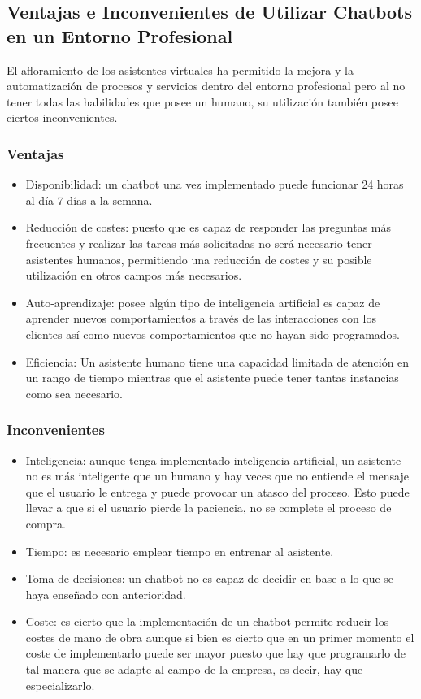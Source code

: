\subsection{Ventajas e Inconvenientes de Utilizar Chatbots en un Entorno Profesional}
El afloramiento de los asistentes virtuales ha permitido la mejora y la automatización de procesos y servicios dentro del entorno profesional pero al no tener todas las habilidades que posee un humano, su utilización también posee ciertos inconvenientes.

\subsubsection{Ventajas}

\begin{itemize}
    \item Disponibilidad: un chatbot una vez implementado puede funcionar 24 horas al día 7 días a la semana.
    \item Reducción de costes: puesto que es capaz de responder las preguntas más frecuentes y realizar las tareas más solicitadas no será necesario tener asistentes humanos, permitiendo una reducción de costes y su posible utilización en otros campos más necesarios.
    \item Auto-aprendizaje: posee algún tipo de inteligencia artificial es capaz de aprender nuevos comportamientos a través de las interacciones con los clientes así como nuevos comportamientos que no hayan sido programados. 
    \item Eficiencia: Un asistente humano tiene una capacidad limitada de atención en un rango de tiempo mientras que el asistente puede tener tantas instancias como sea necesario.
\end{itemize}



\subsubsection{Inconvenientes}

\begin{itemize}
    \item Inteligencia: aunque tenga implementado inteligencia artificial, un asistente no es más inteligente que un humano y hay veces que no entiende el mensaje que el usuario le entrega y puede provocar un atasco del proceso. Esto puede llevar a que si el usuario pierde la paciencia, no se complete el proceso de compra.
    \item Tiempo: es necesario emplear tiempo en entrenar al asistente.
    \item Toma de decisiones: un chatbot no es capaz de decidir en base a lo que se haya enseñado con anterioridad.
    \item Coste: es cierto que la implementación de un chatbot permite reducir los costes de mano de obra aunque si bien es cierto que en un primer momento el coste de implementarlo puede ser mayor puesto que hay que programarlo de tal manera que se adapte al campo de la empresa, es decir, hay que especializarlo.
\end{itemize}


